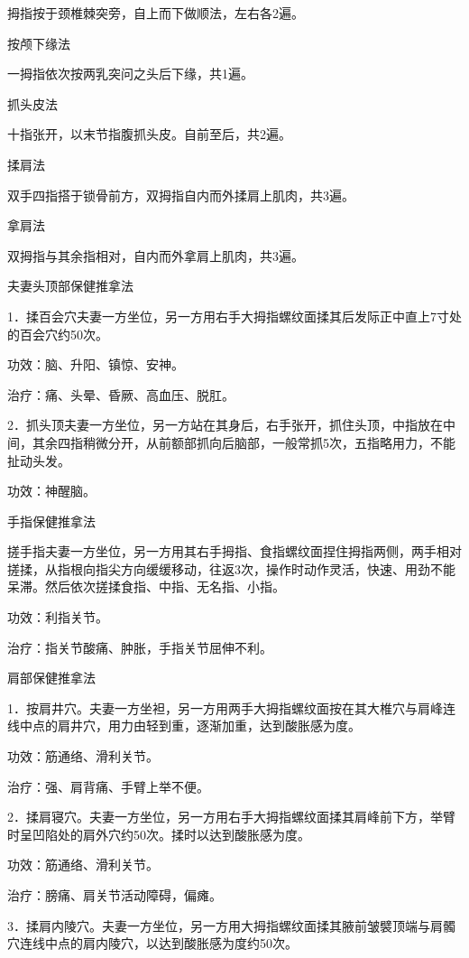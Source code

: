 \documentclass[12pt,UTF8,openany]{ctexbook}
\begin{document}
拇指按于颈椎棘突旁，自上而下做顺法，左右各2遍。

按颅下缘法

一拇指依次按两乳突问之头后下缘，共1遍。

抓头皮法

十指张开，以末节指腹抓头皮。自前至后，共2遍。

揉肩法

双手四指搭于锁骨前方，双拇指自内而外揉肩上肌肉，共3遍。

拿肩法

双拇指与其余指相对，自内而外拿肩上肌肉，共3遍。





夫妻头顶部保健推拿法


1．揉百会穴夫妻一方坐位，另一方用右手大拇指螺纹面揉其后发际正中直上7寸处的百会穴约50次。

功效：脑、升阳、镇惊、安神。

治疗：痛、头晕、昏厥、高血压、脱肛。

2．抓头顶夫妻一方坐位，另一方站在其身后，右手张开，抓住头顶，中指放在中间，其余四指稍微分开，从前额部抓向后脑部，一般常抓5次，五指略用力，不能扯动头发。

功效：神醒脑。





手指保健推拿法


搓手指夫妻一方坐位，另一方用其右手拇指、食指螺纹面捏住拇指两侧，两手相对搓揉，从指根向指尖方向缓缓移动，往返3次，操作时动作灵活，快速、用劲不能呆滞。然后依次搓揉食指、中指、无名指、小指。

功效：利指关节。

治疗：指关节酸痛、肿胀，手指关节屈伸不利。





肩部保健推拿法


1．按肩井穴。夫妻一方坐袒，另一方用两手大拇指螺纹面按在其大椎穴与肩峰连线中点的肩井穴，用力由轻到重，逐渐加重，达到酸胀感为度。

功效：筋通络、滑利关节。

治疗：强、肩背痛、手臂上举不便。

2．揉肩寝穴。夫妻一方坐位，另一方用右手大拇指螺纹面揉其肩峰前下方，举臂时呈凹陷处的肩外穴约50次。揉时以达到酸胀感为度。

功效：筋通络、滑利关节。

治疗：膀痛、肩关节活动障碍，偏瘫。

3．揉肩内陵穴。夫妻一方坐位，另一方用大拇指螺纹面揉其腋前皱襞顶端与肩髑穴连线中点的肩内陵穴，以达到酸胀感为度约50次。
\end{document}
